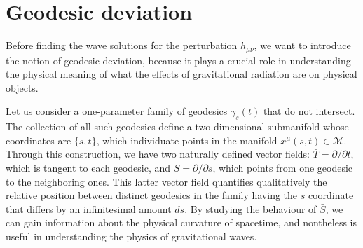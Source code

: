 \documentclass[a4paper]{article}
\begin{document}
\section{Geodesic deviation}
Before finding the wave solutions for the perturbation $h_{\mu\nu}$, we want to introduce the notion of geodesic deviation, because it plays a crucial role in understanding the physical meaning of what the effects of gravitational radiation are on physical objects.

Let us consider a one-parameter family of geodesics $\gamma_s(t)$ that do not intersect. The collection of all such geodesics define a two-dimensional submanifold whose coordinates are $\{s,t\}$, which individuate points in the manifold $x^{\mu}(s,t) \in \mathcal{M}$. Through this construction, we have two naturally defined vector fields: $\bar{T} = \partial/\partial t$, which is tangent to each geodesic, and $\bar{S} = \partial/\partial s$, which points from one geodesic to the neighboring ones.
This latter vector field quantifies qualitatively the relative position between distinct geodesics in the family having the $s$ coordinate that differs by an infinitesimal amount $ds$. By studying the behaviour of $\bar{S}$, we can gain information about the physical curvature of spacetime, and nontheless is useful in understanding the physics of gravitational waves.
\end{document}
